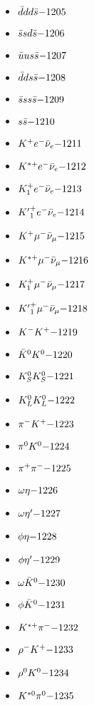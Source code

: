\begin{multicols}{3}
\begin{itemize}
 \item $ \bar{d} d d \bar{s} \hfill{-1205}$
 \item $ \bar{s} s d \bar{s} \hfill{-1206}$
 \item $ \bar{u} u s \bar{s} \hfill{-1207}$
 \item $ \bar{d} d s \bar{s} \hfill{-1208}$
 \item $ \bar{s} s s \bar{s} \hfill{-1209}$
 \item $ s \bar{s} \hfill{-1210}$
 \item $ K^{+} e^{-} \bar{\nu}_{e} \hfill{-1211}$
 \item $ K^{*+} e^{-} \bar{\nu}_{e} \hfill{-1212}$
 \item $ K_{1}^{+} e^{-} \bar{\nu}_{e} \hfill{-1213}$
 \item $ {K^{\prime}}_{1}^{+} e^{-} \bar{\nu}_{e} \hfill{-1214}$
 \item $ K^{+} \mu^{-} \bar{\nu}_{\mu} \hfill{-1215}$
 \item $ K^{*+} \mu^{-} \bar{\nu}_{\mu} \hfill{-1216}$
 \item $ K_{1}^{+} \mu^{-} \bar{\nu}_{\mu} \hfill{-1217}$
 \item $ {K^{\prime}}_{1}^{+} \mu^{-} \bar{\nu}_{\mu} \hfill{-1218}$
 \item $ K^{-} K^{+} \hfill{-1219}$
 \item $ \bar{K}^{0} K^{0} \hfill{-1220}$
 \item $ K_{S}^{0} K_{S}^{0} \hfill{-1221}$
 \item $ K_{L}^{0} K_{L}^{0} \hfill{-1222}$
 \item $ \pi^{-} K^{+} \hfill{-1223}$
 \item $ \pi^{0} K^{0} \hfill{-1224}$
 \item $ \pi^{+} \pi^{-} \hfill{-1225}$
 \item $ \omega \eta \hfill{-1226}$
 \item $ \omega {\eta^{\prime}} \hfill{-1227}$
 \item $ \phi \eta \hfill{-1228}$
 \item $ \phi {\eta^{\prime}} \hfill{-1229}$
 \item $ \omega \bar{K}^{0} \hfill{-1230}$
 \item $ \phi \bar{K}^{0} \hfill{-1231}$
 \item $ K^{*+} \pi^{-} \hfill{-1232}$
 \item $ \rho^{-} K^{+} \hfill{-1233}$
 \item $ \rho^{0} K^{0} \hfill{-1234}$
 \item $ K^{*0} \pi^{0} \hfill{-1235}$

\end{itemize}
\end{multicols}
